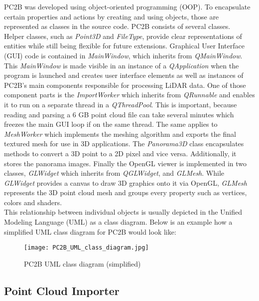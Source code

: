 PC2B was developed using object-oriented programming (OOP). To encapsulate certain properties and actions by creating and using objects, those are represented as classes in the source code. PC2B consists of several classes.\\
Helper classes, such as \textit{Point3D} and \textit{FileType}, provide clear representations of entities while still being flexible for future extensions. Graphical User Interface (GUI) code is contained in \textit{MainWindow}, which inherits from \textit{QMainWindow}. This \textit{MainWindow} is made visible in an instance of a \textit{QApplication} when the program is launched and creates user interface elements as well as instances of PC2B's main components responsible for processing LiDAR data. One of those component parts is the \textit{ImportWorker} which inherits from \textit{QRunnable} and enables it to run on a separate thread in a \textit{QThreadPool}. This is important, because reading and parsing a 6 GB point cloud file can take several minutes which freezes the main GUI loop if on the same thread. The same applies to \textit{MeshWorker} which implements the meshing algorithm and exports the final textured mesh for use in 3D applications. The \textit{Panorama3D} class encapsulates methods to convert a 3D point to a 2D pixel and vice versa. Additionally, it stores the panorama images. Finally the OpenGL viewer is implemented in two classes, \textit{GLWidget} which inherits from \textit{QGLWidget}, and \textit{GLMesh}. While \textit{GLWidget} provides a canvas to draw 3D graphics onto it via OpenGL, \textit{GLMesh} represents the 3D point cloud mesh and groups every property such as vertices, colors and shaders.\\
This relationship between individual objects is usually depicted in the Unified Modeling Language (UML) as a class diagram. Below is an example how a simplified UML class diagram for PC2B would look like:

\begin{figure}[h]
	\centering
	\texttt{[image: PC2B\_UML\_class\_diagram.jpg]}
	\caption{PC2B UML class diagram (simplified)}
	\label{fig:pc2b_uml_class_diagram}
\end{figure}

\subsection{Point Cloud Importer}

